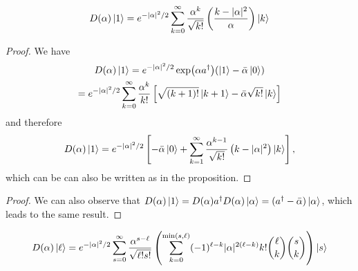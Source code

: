 \documentclass[12pt]{report}
\begin{document}
\begin{prop}
	\begin{equation}
	\begin{gathered}
		D(\alpha)\ket1
		= e^{-|\alpha|^2/2}
			\sum_{k=0}^\infty \frac{\alpha^{k}}{\sqrt{k!}}
			\left( \frac{ k - |\alpha|^2 }{ \alpha } \right) \ket k
	\end{gathered}
	\end{equation}
	\label{prop:displacement_action_on_1}
\end{prop}
\begin{proof}
	We have
	\begin{equation}
	\begin{gathered}
		D(\alpha) \ket 1
		= e^{-|\alpha|^2/2}
		  \exp(\alpha a^\dagger) (\ket1 - \bar\alpha \ket0) \\
		= e^{-|\alpha|^2/2}
		  \sum_{k=0}^\infty \frac{\alpha^k}{k!} \left[
		  	\sqrt{(k+1)!}\ket{k+1}
		  	- \bar\alpha \sqrt{k!}\ket k
		  \right]
	\end{gathered}
	\end{equation}
	and therefore
	\begin{equation}
		D(\alpha)\ket1
		= e^{-|\alpha|^2/2} \left[
			-\bar\alpha \ket 0
			+ \sum_{k=1}^\infty \frac{\alpha^{k-1}}{\sqrt{k!}}\left(
			k - |\alpha|^2
			\right) \ket k
		\right],
	\end{equation}
	which can be can also be written as in the proposition.
\end{proof}
\begin{proof}
	We can also observe that $D(\alpha)\ket1=D(\alpha) a^\dagger D(\alpha)\ket\alpha=(a^\dagger-\bar\alpha)\ket\alpha$, which leads to the same result.
\end{proof}

\begin{prop}
	\begin{equation}
		D(\alpha) \ket \ell
		= e^{-|\alpha|^2/2}
		\sum_{s=0}^\infty \frac{\alpha^{s-\ell}}{\sqrt{\ell!s!}}
		\left(
		\sum_{k=0}^{\min(s,\ell)}
		(-1)^{\ell-k}|\alpha|^{2(\ell-k)} k!\binom{\ell}{k}\binom{s}{k}
		\right)
		\ket{s}
	\end{equation}
\end{prop}
\end{document}

